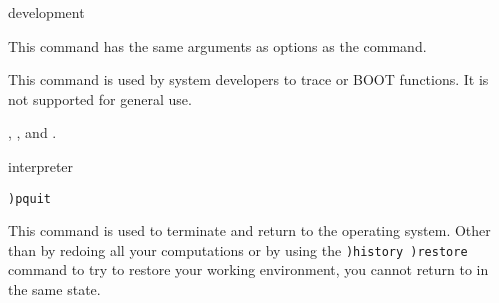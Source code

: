 {{{{{{{%




\par{} development

\par{}

This command has the same arguments as options as the
 command.

\par{}

This command is used by \Language{} system developers to trace
\Lisp{} or
BOOT functions.
It is not supported for general use.

\par{}
,
, and
.




\par{} interpreter

\par{}
\begin{simpleList}
\item{\tt )pquit}
\end{simpleList}

\par{}

This command is used to terminate \Language{}  and return to the
operating system.
Other than by redoing all your computations or by
using the {\tt )history )restore}
command to try to restore your working environment,
you cannot return to \Language{} in the same state.

}}}}}}}
